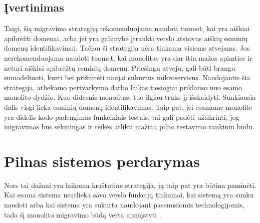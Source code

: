 \documentclass[fleqn]{VUMIFPSkursinis}
\begin{document}
\subsection{Įvertinimas}
Taigi, šią migravimo strategiją rekomenduojama naudoti tuomet, kai yra aiškiai apibrėžti domenai, arba jei yra galimybė įtraukti verslo atstovus aiškių esminių domenų identifikavimui. Tačiau ši strategija nėra tinkama visiems atvejams. Jos nerekomenduojama naudoti tuomet, kai monolitas yra dar itin mažos apimties ir neturi aiškiai apibrėžtų esminių domenų. Priešingu atveju, gali būti brangu sumodeliuoti, kurti bei prižiūrėti naujai sukurtus mikroservisus. Naudojantis šia strategija, atliekamo pertvarkymo darbo laikas tiesiogiai priklauso nuo esamo monolito dydžio. Kuo didesnis monolitas, tuo ilgiau truks jį išskaidyti. Sunkiausia dalis visgi lieka esminių domenų identifikavimas. Taip pat, jei esamame monolite yra didelis kodo padengimas funkciniais testais, tai gali padėti užtikrinti, jog migravimas bus sėkmingas ir reikės atlikti mažiau pilno testavimo rankiniu būdu.

\section{Pilnas sistemos perdarymas}
Nors tai dažnai yra laikoma kraštutine strategija, ją taip pat yra būtina paminėti. Kai esama sistema neatlieka savo verslo funkcijų tinkamai, kai sistemą yra sunku naudoti arba kai sistema yra sukurta naudojant pasenusiomis technologijomis, tada šį monolito migravimo būdą verta apmąstyti \cite{MQO18}.
\end{document}
